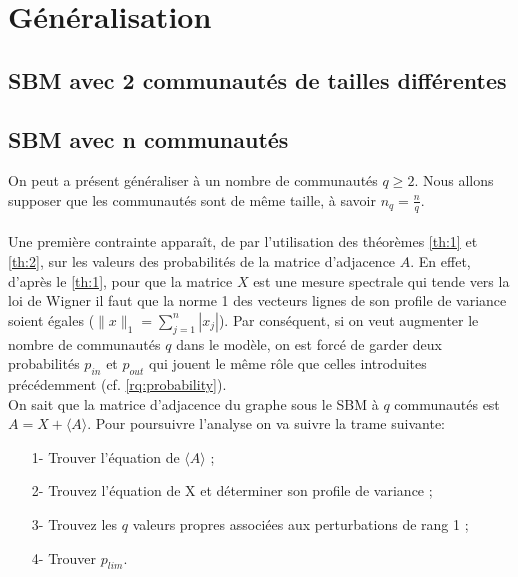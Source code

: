 \section{Généralisation}
\subsection{SBM avec 2 communautés de tailles différentes}

\subsection{SBM avec n communautés}

On peut a présent généraliser à un nombre de communautés $q \geq 2$.
Nous allons supposer que les communautés sont de même taille, à savoir $n_q = \frac{n}{q}$.
\paragraph{}\label{rq:contrainte model}
Une première contrainte apparaît, de par l'utilisation des théorèmes \ref{th:1} et \ref{th:2}, sur les valeurs des probabilités de la matrice d'adjacence $A$.
En effet, d'après le \autoref{th:1}, pour que la matrice $X$ est une mesure spectrale qui tende vers la loi de Wigner il faut que la norme 1 des vecteurs lignes de son profile de variance soient égales ($\parallel x \parallel_1 = \sum_{j=1}^{n}|x_j|$).
Par conséquent, si on veut augmenter le nombre de communautés $q$ dans le modèle, on est forcé de garder deux probabilités $p_{in}$ et $p_{out}$ qui jouent le même rôle que celles introduites précédemment (cf. \ref{rq:probability}).\\

On sait que la matrice d’adjacence du graphe sous le SBM à $q$ communautés est $A = X + \langle A \rangle$.  
Pour poursuivre l'analyse on va suivre la trame suivante:
\begin{itemize}
	\item[1-] Trouver l'équation de $\langle A \rangle$ ;
	\item[2-] Trouvez l'équation de X et déterminer son profile de variance ;
	\item[3-] Trouvez les $q$ valeurs propres associées aux perturbations de rang 1 ;
	\item[4-] Trouver $p_{lim}$.\\
\end{itemize}

